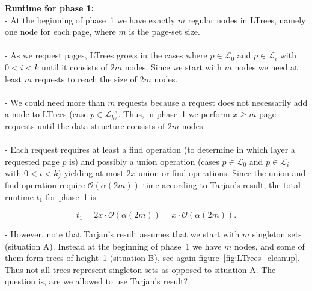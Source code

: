 \documentclass[a4paper,12pt, titlepage]{article}  %
\newcommand{\cl}{\mathcal{L}}   %
\newcommand{\oh}{\mathcal{O}}   %
\begin{document}
\noindent \textbf{Runtime for phase 1:}\\
\noindent - At the beginning of phase~1 we have exactly $m$ regular nodes in LTrees, namely one node for each page, 
where $m$ is the page-set size. \\
\\
- As we request pages, LTrees grows in the cases where $p\in\cl_0$ and $p\in\cl_i$ with $0<i<k$ until 
it consists of $2m$ nodes. Since we start with $m$ nodes we need at least $m$ requests to reach the size 
of $2m$ nodes. \\
\\
- We could need more than $m$ requests because a request does not necessarily add a node to LTrees
(case $p\in\cl_k$). Thus, in phase~1 we perform $x \geq m$ page requests until the data structure consists of $2m$ nodes.\\
\\
- Each request requires at least a find operation (to determine in which layer a requested page $p$ is) and possibly
a union operation (cases $p\in\cl_0$ and $p\in\cl_i$ with $0<i<k$) yielding at most $2x$ union or find operations. 
Since the union and find operation require $\oh(\alpha(2m))$ time according to Tarjan's result, the total runtime $t_1$ for phase~1 is
 
\[
t_1 = 2x \cdot \oh(\alpha(2m))=x \cdot \oh(\alpha(2m)).
\]

\noindent - However, note that Tarjan's result assumes that we start with $m$ singleton sets (situation A). 
Instead at the beginning of phase~1 we have $m$ nodes, and some of them form trees of height~1 (situation B), see again 
figure~\ref{fig:LTrees_cleanup}. Thus not all trees represent singleton sets as opposed to situation A. The question is, are we allowed to use Tarjan's result?
\end{document}

